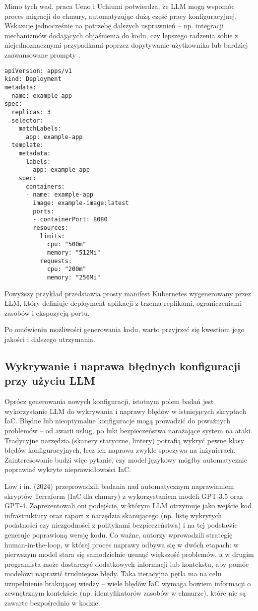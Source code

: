 Mimo tych wad, praca Ueno i Uchiumi potwierdza, że LLM mogą wspomóc proces migracji do chmury, automatyzując dużą część pracy konfiguracyjnej. Wskazuje jednocześnie na potrzebę dalszych usprawnień – np. integracji mechanizmów dodających objaśnienia do kodu, czy lepszego radzenia sobie z niejednoznacznymi przypadkami poprzez dopytywanie użytkownika lub bardziej zaawansowane prompty \cite{ueno_migrating_2024}.

\begin{lstlisting}
apiVersion: apps/v1
kind: Deployment
metadata:
  name: example-app
spec:
  replicas: 3
  selector:
    matchLabels:
      app: example-app
  template:
    metadata:
      labels:
        app: example-app
    spec:
      containers:
      - name: example-app
        image: example-image:latest
        ports:
        - containerPort: 8080
        resources:
          limits:
            cpu: "500m"
            memory: "512Mi"
          requests:
            cpu: "200m"
            memory: "256Mi"
\end{lstlisting}

Powyższy przykład przedstawia prosty manifest Kubernetes wygenerowany przez LLM, który definiuje deployment aplikacji z trzema replikami, ograniczeniami zasobów i ekspozycją portu.

Po omówieniu możliwości generowania kodu, warto przyjrzeć się kwestiom jego jakości i dalszego utrzymania.

\subsection{Wykrywanie i naprawa błędnych konfiguracji przy użyciu LLM}

Oprócz generowania nowych konfiguracji, istotnym polem badań jest wykorzystanie LLM do wykrywania i naprawy błędów w istniejących skryptach IaC. Błędne lub nieoptymalne konfiguracje mogą prowadzić do poważnych problemów – od awarii usług, po luki bezpieczeństwa narażające system na ataki. Tradycyjne narzędzia (skanery statyczne, lintery) potrafią wykryć pewne klasy błędów konfiguracyjnych, lecz ich naprawa zwykle spoczywa na inżynierach. Zainteresowanie budzi więc pytanie, czy model językowy mógłby automatycznie poprawiać wykryte nieprawidłowości IaC.

Low i in. (2024) przeprowadzili badania nad automatycznym naprawianiem skryptów Terraform (IaC dla chmury) z wykorzystaniem modeli GPT-3.5 oraz GPT-4. Zaprezentowali oni podejście, w którym LLM otrzymuje jako wejście kod infrastruktury oraz raport z narzędzia skanującego (np. listę wykrytych podatności czy niezgodności z politykami bezpieczeństwa) i na tej podstawie generuje poprawioną wersję kodu. Co ważne, autorzy wprowadzili strategię human-in-the-loop, w której proces naprawy odbywa się w dwóch etapach: w pierwszym model stara się samodzielnie usunąć większość problemów, a w drugim programista może dostarczyć dodatkowych informacji lub kontekstu, aby pomóc modelowi naprawić trudniejsze błędy. Taka iteracyjna pętla ma na celu uzupełnienie brakującej wiedzy – wiele błędów IaC wymaga bowiem informacji o zewnętrznym kontekście (np. identyfikatorów zasobów w chmurze), które nie są zawarte bezpośrednio w kodzie.

